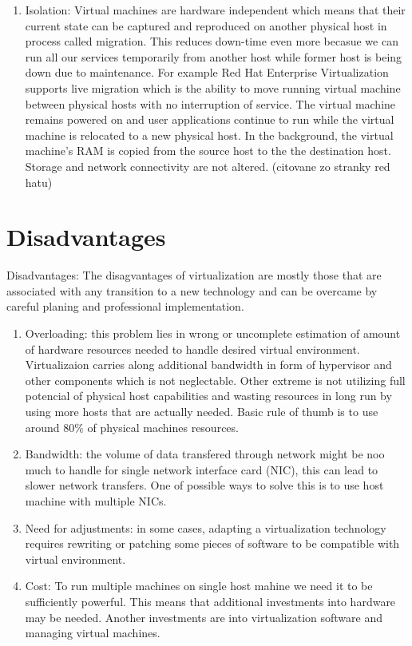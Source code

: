 \begin{itemize}
\begin{enumerate}
\item Isolation: Virtual machines are hardware independent which means that their current state can be captured and reproduced on another physical host in process called migration. This reduces down-time even more becasue we can run all our services temporarily from another host while former host is being down due to maintenance. For example Red Hat Enterprise Virtualization supports live migration which is the ability to move running virtual machine between physical hosts with no interruption of service. The virtual machine remains powered on and user applications continue to run while the virtual machine is relocated to a new physical host. In the background, the virtual machine's RAM is copied from the source host to the the destination host. Storage and network connectivity are not altered. (citovane zo stranky red hatu)
\end{enumerate}

\section{Disadvantages}
Disadvantages: 
The disagvantages of virtualization are mostly those that are associated with any transition to a new technology and can be overcame by careful planing and professional implementation.
\begin{enumerate}
\item Overloading: this problem lies in wrong or uncomplete estimation of amount of hardware resources needed to handle desired virtual environment. Virtualizaion carries along additional bandwidth in form of hypervisor and other components which is not neglectable. Other extreme is not utilizing full potencial of physical host capabilities and wasting resources in long run by using more hosts that are actually needed. Basic rule of thumb is to use around 80\% of physical machines resources.

\item Bandwidth: the volume of data transfered through network might be noo much to handle for single network interface card (NIC), this can lead to slower network transfers. One of possible ways to solve this is to use host machine with multiple NICs.

\item Need for adjustments: in some cases, adapting a virtualization technology requires rewriting or patching some pieces of software to be compatible with virtual environment. 

\item Cost: To run multiple machines on single host mahine we need it to be sufficiently powerful. This means that additional investments into hardware may be needed. Another investments are into virtualization software and managing virtual machines.


\end{enumerate}
\end{itemize}

